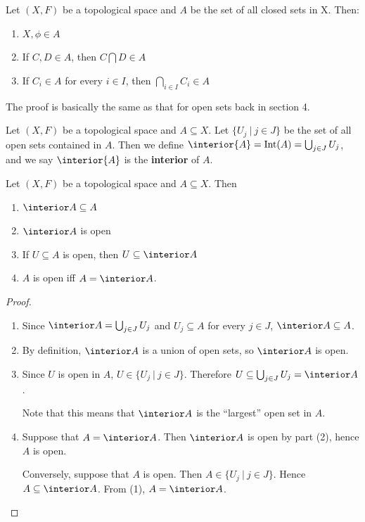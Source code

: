 \begin{lemma} Let $(X,F)$ be a topological space and $A$ be the set of all closed sets in X. Then:
\begin{enumerate}
\item $X,\phi \in A$
\item If $C,D \in A$, then $C \bigcap D \in A$
\item If $C_i \in A$ for every $i \in I$, then $\bigcap_{i\in I}C_i \in A$
\end{enumerate}
\end{lemma}
The proof is basically the same as that for open sets back in section 4.


\begin{definition}
 Let $(X,F)$ be a topological space and $A \subseteq X$. Let $\{ U_j\ |\ j \in J \}$ be the set of all open sets contained in $A$. Then we define $\interior{A} = \mathrm{Int}(A) = \bigcup_{j \in J} U_j$, and we say $\interior{A}$ is the {\bf interior} of $A$.
\end{definition}

\begin{smallfact} Let $(X,F)$ be a topological space and $A \subseteq X$. Then
\begin{enumerate}
\item $\interior A \subseteq A$
\item $\interior A$ is open
\item If $U\subseteq A$ is open, then $U\subseteq \interior A$
\item $A$ is open iff $A = \interior A$.
\end{enumerate}
\end{smallfact}
\begin{proof}
\begin{enumerate}
\item Since $\interior A =  \bigcup_{j\in J} U_j$ and $U_j \subseteq A$ for every $j \in J$, $\interior A\subseteq  A$.
\item By definition, $\interior A$ is a union of open sets, so $\interior A$ is open.
\item Since $U$ is open in $A$, $U \in \{ U_j\ |\ j\in J\}$.  Therefore $U\subseteq \bigcup_{j\in J} U_j = \interior A$.  

Note that this means that $\interior A$ is the ``largest'' open set in $A$.
\item Suppose that $A = \interior A$.  Then $\interior A$ is open by part (2), hence $A$ is open.

Conversely, suppose that $A$ is open.  Then $A\in \{U_j\ |\ j\in J\}$.  Hence $A \subseteq \interior A$.  From (1), $A = \interior A$.
\end{enumerate}
\end{proof}

